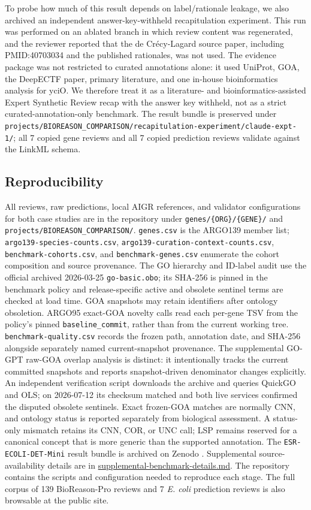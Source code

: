 \documentclass[
  11pt,
]{article}
\begin{document}
To probe how much of this result depends on label/rationale leakage, we
also archived an independent answer-key-withheld recapitulation
experiment. This run was performed on an ablated branch in which review
content was regenerated, and the reviewer reported that the de
Crécy-Lagard source paper, including PMID:40703034 and the published
rationales, was not used. The evidence package was not restricted to
curated annotations alone: it used UniProt, GOA, the DeepECTF paper,
primary literature, and one in-house bioinformatics analysis for yciO.
We therefore treat it as a literature- and bioinformatics-assisted
Expert Synthetic Review recap with the answer key withheld, not as a
strict curated-annotation-only benchmark. The result bundle is preserved
under
\texttt{projects/BIOREASON\_COMPARISON/recapitulation-experiment/claude-expt-1/};
all 7 copied gene reviews and all 7 copied prediction reviews validate
against the LinkML schema.

\hypertarget{reproducibility}{%
\subsection{Reproducibility}\label{reproducibility}}

All reviews, raw predictions, local AIGR references, and validator
configurations for both case studies are in the repository under
\texttt{genes/\{ORG\}/\{GENE\}/} and
\texttt{projects/BIOREASON\_COMPARISON/}. \texttt{genes.csv} is the
ARGO139 member list; \texttt{argo139-species-counts.csv},
\texttt{argo139-curation-context-counts.csv},
\texttt{benchmark-cohorts.csv}, and \texttt{benchmark-genes.csv}
enumerate the cohort composition and source provenance. The
GO hierarchy and ID-label audit use the official archived 2026-03-25
\texttt{go-basic.obo}; its SHA-256 is pinned in the benchmark policy and
release-specific active and obsolete sentinel terms are checked at load
time. GOA snapshots may retain identifiers after ontology obsoletion.
ARGO95 exact-GOA novelty calls read each per-gene TSV from the
policy's pinned \texttt{baseline\_commit}, rather than from the current
working tree. \texttt{benchmark-quality.csv} records the frozen path,
annotation date, and SHA-256 alongside separately named current-snapshot
provenance. The supplemental GO-GPT raw-GOA overlap analysis is distinct:
it intentionally tracks the current committed snapshots and reports
snapshot-driven denominator changes explicitly.
An independent verification script downloads the archive and queries
QuickGO and OLS; on 2026-07-12 its checksum matched and both live services
confirmed the disputed obsolete sentinels. Exact frozen-GOA matches are
normally CNN, and ontology status is reported separately from biological
assessment. A status-only mismatch retains its CNN, COR, or UNC call; LSP
remains reserved for a canonical concept that is more generic than the
supported annotation.
The
\texttt{ESR-ECOLI-DET-Mini} result bundle is archived on Zenodo
\cite{mungall2026esrecolidetmini}. Supplemental source-availability
details are in \url{supplemental-benchmark-details.md}. The repository
contains the scripts and configuration needed to reproduce each stage.
The full corpus of 139 BioReason-Pro reviews and 7 \emph{E. coli}
prediction reviews is also browsable at the public site.
\end{document}
